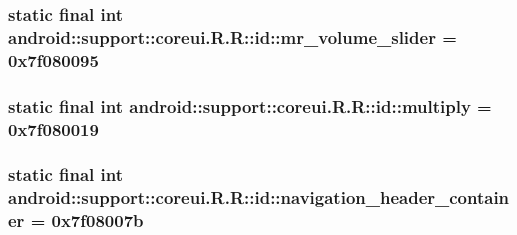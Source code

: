\hypertarget{classandroid_1_1support_1_1coreui_1_1_r_1_1id_4298b37b0c0bca02b54d211e27eca113}{
\subsubsection[{mr\_\-volume\_\-slider}]{\setlength{\rightskip}{0pt plus 5cm}static final int android::support::coreui.R.R::id::mr\_\-volume\_\-slider = 0x7f080095}}
\label{classandroid_1_1support_1_1coreui_1_1_r_1_1id_4298b37b0c0bca02b54d211e27eca113}


\hypertarget{classandroid_1_1support_1_1coreui_1_1_r_1_1id_b55cf64e1d68a9a09bc6d118f8fb8e80}{
\subsubsection[{multiply}]{\setlength{\rightskip}{0pt plus 5cm}static final int android::support::coreui.R.R::id::multiply = 0x7f080019}}
\label{classandroid_1_1support_1_1coreui_1_1_r_1_1id_b55cf64e1d68a9a09bc6d118f8fb8e80}


\hypertarget{classandroid_1_1support_1_1coreui_1_1_r_1_1id_911d60d8a11876bd2af64ed64721de8d}{
\subsubsection[{navigation\_\-header\_\-container}]{\setlength{\rightskip}{0pt plus 5cm}static final int android::support::coreui.R.R::id::navigation\_\-header\_\-container = 0x7f08007b}}
\label{classandroid_1_1support_1_1coreui_1_1_r_1_1id_911d60d8a11876bd2af64ed64721de8d}


